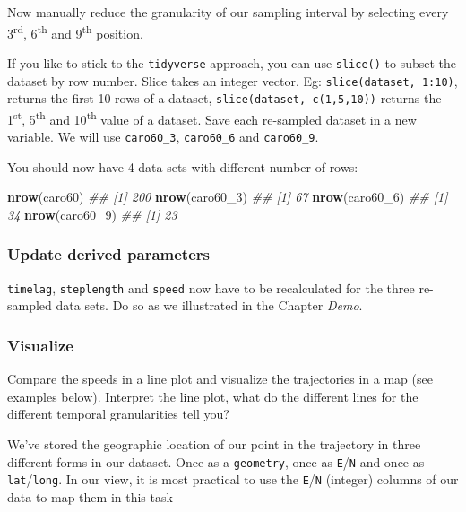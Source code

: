 \documentclass[]{book}
\newenvironment{Shaded}{\begin{snugshade}}{\end{snugshade}}
\newcommand{\CommentTok}[1]{\textcolor[rgb]{0.56,0.35,0.01}{\textit{#1}}}
\newcommand{\DecValTok}[1]{\textcolor[rgb]{0.00,0.00,0.81}{#1}}
\newcommand{\KeywordTok}[1]{\textcolor[rgb]{0.13,0.29,0.53}{\textbf{#1}}}
\newcommand{\NormalTok}[1]{#1}
\begin{document}
Now manually reduce the granularity of our sampling interval by selecting every 3\textsuperscript{rd}, 6\textsuperscript{th} and 9\textsuperscript{th} position.

If you like to stick to the \texttt{tidyverse} approach, you can use \texttt{slice()} to subset the dataset by row number. Slice takes an integer vector. Eg: \texttt{slice(dataset,\ 1:10)}, returns the first 10 rows of a dataset, \texttt{slice(dataset,\ c(1,5,10))} returns the 1\textsuperscript{st}, 5\textsuperscript{th} and 10\textsuperscript{th} value of a dataset. Save each re-sampled dataset in a new variable. We will use \texttt{caro60\_3}, \texttt{caro60\_6} and \texttt{caro60\_9}.

You should now have 4 data sets with different number of rows:

\begin{Shaded}
\begin{Highlighting}[]
\KeywordTok{nrow}\NormalTok{(caro60)}
\CommentTok{## [1] 200}
\KeywordTok{nrow}\NormalTok{(caro60_}\DecValTok{3}\NormalTok{)}
\CommentTok{## [1] 67}
\KeywordTok{nrow}\NormalTok{(caro60_}\DecValTok{6}\NormalTok{)}
\CommentTok{## [1] 34}
\KeywordTok{nrow}\NormalTok{(caro60_}\DecValTok{9}\NormalTok{)}
\CommentTok{## [1] 23}
\end{Highlighting}
\end{Shaded}

\hypertarget{update-derived-parameters}{%
\subsubsection{Update derived parameters}\label{update-derived-parameters}}

\texttt{timelag}, \texttt{steplength} and \texttt{speed} now have to be recalculated for the three re-sampled data sets. Do so as we illustrated in the Chapter \emph{Demo}.

\hypertarget{visualize}{%
\subsubsection{Visualize}\label{visualize}}

Compare the speeds in a line plot and visualize the trajectories in a map (see examples below). Interpret the line plot, what do the different lines for the different temporal granularities tell you?

We've stored the geographic location of our point in the trajectory in three different forms in our dataset. Once as a \texttt{geometry}, once as \texttt{E}/\texttt{N} and once as \texttt{lat}/\texttt{long}. In our view, it is most practical to use the \texttt{E}/\texttt{N} (integer) columns of our data to map them in this task
\end{document}
